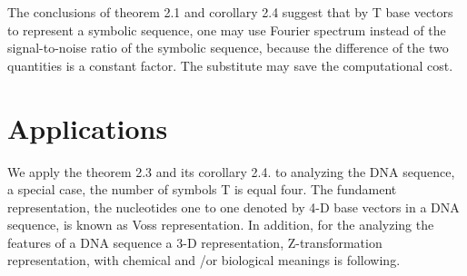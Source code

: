\documentclass[preprint,authoryear,12pt]{elsarticle}
\begin{document}
The conclusions of theorem 2.1 and corollary 2.4 suggest that by T base vectors to represent a symbolic sequence, one may use Fourier spectrum instead of the signal-to-noise ratio of the symbolic sequence, because the difference of the two quantities is a constant factor. The substitute may save the computational cost.

\section{Applications}
We apply the theorem 2.3 and its corollary 2.4. to analyzing the DNA sequence, a special case, the number of symbols T  is equal four. The fundament representation, the nucleotides one to one denoted by 4-D base vectors in a DNA sequence, is known as Voss representation\citep{VOSS1993}. In addition, for the analyzing the features of a DNA sequence a 3-D representation, Z-transformation representation, with chemical and /or biological meanings is following\citep{ZHANG1998}.
\end{document}
